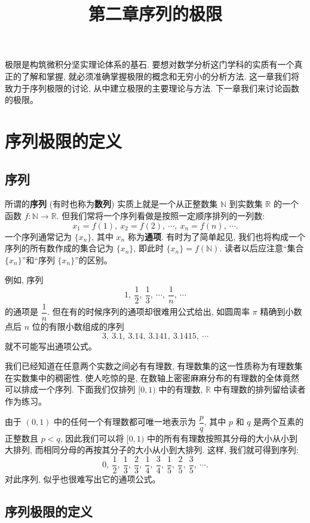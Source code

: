 \documentclass[UTF8, 12pt, fontset=fandol, oneside]{ctexart}
\title{第二章\quad 序列的极限}
\author{}
\date{}
\begin{document}
\maketitle

极限是构筑微积分坚实理论体系的基石. 要想对数学分析这门学科的实质有一个真正的了解和掌握, 就必须准确掌握极限的概念和无穷小的分析方法. 这一章我们将致力于序列极限的讨论, 从中建立极限的主要理论与方法. 下一章我们来讨论函数的极限。

\section{序列极限的定义}

\subsection{序列}

所谓的\textbf{序列} (有时也称为\textbf{数列}) 实质上就是一个从正整数集 $\mathbb{N}$ 到实数集 $\mathbb{R}$ 的一个函数 $f:\mathbb{N}\to\mathbb{R}$. 但我们常将一个序列看做是按照一定顺序排列的一列数:
\[
  x_1=f(1),\ x_2=f(2),\ \cdots,\ x_n=f(n),\ \cdots .
\]
一个序列通常记为 $\{x_n\}$, 其中 $x_n$ 称为\textbf{通项}. 有时为了简单起见, 我们也将构成一个序列的所有数作成的集合记为 $\{x_n\}$, 即此时 $\{x_n\}=f(\mathbb{N})$. 读者以后应注意``集合 $\{x_n\}$''和``序列 $\{x_n\}$''的区别。

例如, 序列
\[
  1,\ \frac12,\ \frac13,\ \cdots,\ \frac1n,\ \cdots
\]
的通项是 $\dfrac1n$. 但在有的时候序列的通项却很难用公式给出, 如圆周率 $\pi$ 精确到小数点后 $n$ 位的有限小数组成的序列
\[
  3,\ 3.1,\ 3.14,\ 3.141,\ 3.1415,\ \cdots
\]
就不可能写出通项公式。

我们已经知道在任意两个实数之间必有有理数, 有理数集的这一性质称为有理数集在实数集中的稠密性. 使人吃惊的是, 在数轴上密密麻麻分布的有理数的全体竟然可以排成一个序列. 下面我们仅排列 $[0,1)$ 中的有理数, $\mathbb{R}$ 中有理数的排列留给读者作为练习。

由于 $(0,1)$ 中的任何一个有理数都可唯一地表示为 $\dfrac pq$, 其中 $p$ 和 $q$ 是两个互素的正整数且 $p<q$, 因此我们可以将 $[0,1)$ 中的所有有理数按照其分母的大小从小到大排列, 而相同分母的再按其分子的大小从小到大排列. 这样, 我们就可得到序列:
\[
  0,\ \frac12,\ \frac13,\ \frac23,\ \frac14,\ \frac34,\ \frac15,\ \frac25,\ \frac35,\ \cdots .
\]
对此序列, 似乎也很难写出它的通项公式。

\subsection{序列极限的定义}
\end{document}
